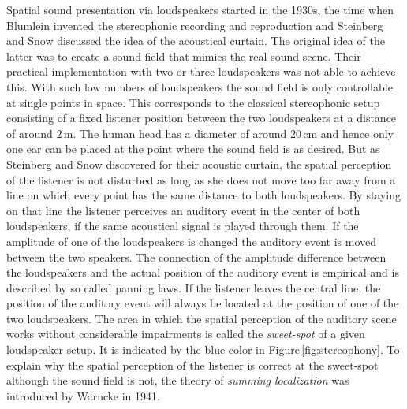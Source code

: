 Spatial sound presentation via loudspeakers started in the 1930s, the time when
Blumlein invented the stereophonic recording and
reproduction\cite{Blumlein1958} and Steinberg and Snow discussed the idea of
the acoustical curtain.\cite{Steinberg1934}
The original idea of the latter was to create a sound field that mimics the real sound
scene. Their practical implementation with two or three loudspeakers was not able
to achieve this. With such low numbers of loudspeakers the sound field is only
controllable at single points in space. This corresponds to the classical
stereophonic setup consisting of a fixed listener position between the two
loudspeakers at a distance of around $2$\,m.
The human head has a diameter of around $20$\,cm and hence only one ear can
be placed at the point where the sound field is as desired. But as Steinberg and
Snow discovered for their acoustic curtain, the spatial perception of the
listener is not disturbed as long as she does not move too far away from a line
on which every point has the same distance to both loudspeakers.
By staying on that line the listener perceives an
auditory event in the center of both loudspeakers, if the same acoustical signal
is played through them. If the amplitude of one of the loudspeakers is changed
the auditory event is moved between the two speakers. The connection of the
amplitude difference between the loudspeakers and the actual position of the
auditory event is empirical and is described by so called panning
laws.\cite{Leakey1959}
If the listener leaves the central line, the position of the auditory event
will always be located at the position of one of the two loudspeakers. The area in which the
spatial perception of the auditory scene works without considerable impairments
is called the \emph{sweet-spot} of a given loudspeaker setup. It is indicated
by the blue color in Figure\,\ref{fig:stereophony}.
To explain why the spatial perception of the listener is correct at the
sweet-spot although the sound field is not, the theory of \emph{summing
localization} was introduced by Warncke in 1941.\cite[A discussion is
provided in][p.\,204]{Blauert1997}

